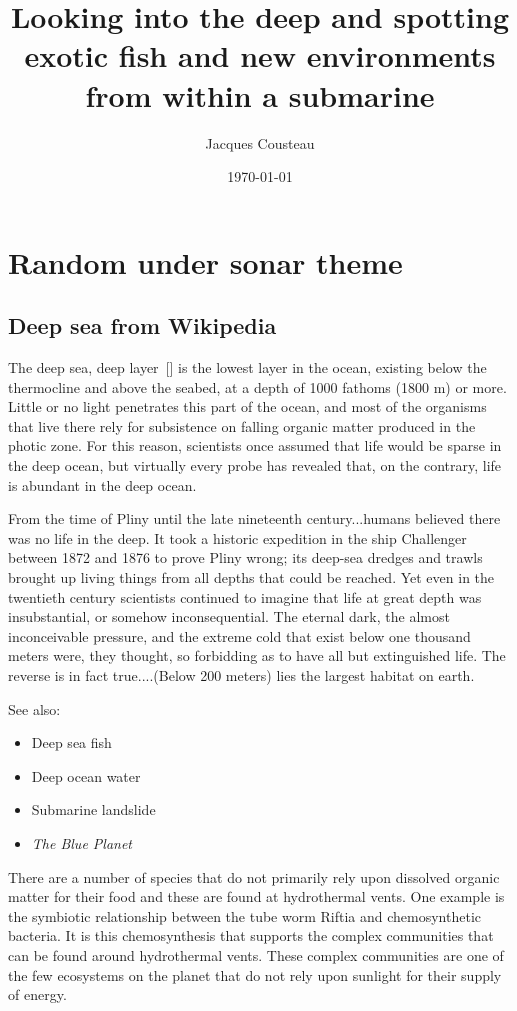 \documentclass[12pt,twocolumn]{article}
\title{Looking into the deep and spotting exotic fish and new environments from within a submarine}
\author{Jacques Cousteau}
\date{\today}
\begin{document}
\maketitle




\section{Random under sonar theme}

\subsection{Deep sea from Wikipedia}
The deep sea, deep layer~[\cite{gortney2010department}] is the lowest layer in the ocean, existing below the thermocline and above the seabed, at a depth of 1000 fathoms (1800 m) or more. Little or no light penetrates this part of the ocean, and most of the organisms that live there rely for subsistence on falling organic matter produced in the photic zone. For this reason, scientists once assumed that life would be sparse in the deep ocean, but virtually every probe has revealed that, on the contrary, life is abundant in the deep ocean.

    From the time of Pliny until the late nineteenth century...humans believed there was no life in the deep. It took a historic expedition in the ship Challenger between 1872 and 1876 to prove Pliny wrong; its deep-sea dredges and trawls brought up living things from all depths that could be reached. Yet even in the twentieth century scientists continued to imagine that life at great depth was insubstantial, or somehow inconsequential. The eternal dark, the almost inconceivable pressure, and the extreme cold that exist below one thousand meters were, they thought, so forbidding as to have all but extinguished life. The reverse is in fact true....(Below 200 meters) lies the largest habitat on earth.

 See also:
\begin{itemize}
\item Deep sea fish
\item Deep ocean water
\item Submarine landslide
\item \emph{The Blue Planet}
\end{itemize}

There are a number of species that do not primarily rely upon dissolved organic matter for their food and these are found at hydrothermal vents. One example is the symbiotic relationship between the tube worm Riftia and chemosynthetic bacteria. It is this chemosynthesis that supports the complex communities that can be found around hydrothermal vents. These complex communities are one of the few ecosystems on the planet that do not rely upon sunlight for their supply of energy.
\end{document}
